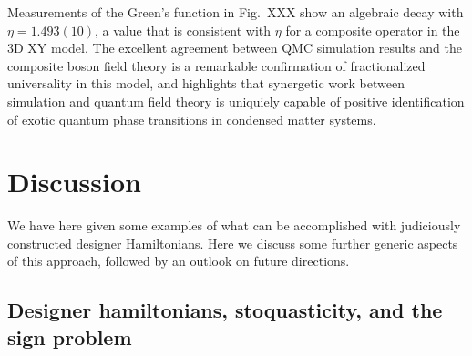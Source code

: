 \documentclass[range]{ar2e}
\begin{document}
Measurements of the Green's function in Fig.~XXX show an algebraic decay with $\eta=1.493(10)$, a value that is consistent with $\eta$ for a composite operator in the 3D XY model.  The excellent agreement between QMC simulation results and the composite boson field theory is a remarkable confirmation of fractionalized universality in this model, and highlights that synergetic work between simulation and quantum field theory is uniquiely capable of positive identification of exotic quantum phase transitions in condensed matter systems.



\section{Discussion}
\label{sec:discussion}

We have here given some examples of what can be accomplished with judiciously constructed designer Hamiltonians. Here we discuss
some further generic aspects of this approach, followed by an outlook on future directions.

\subsection{Designer hamiltonians, stoquasticity, and the sign problem}
\end{document}
